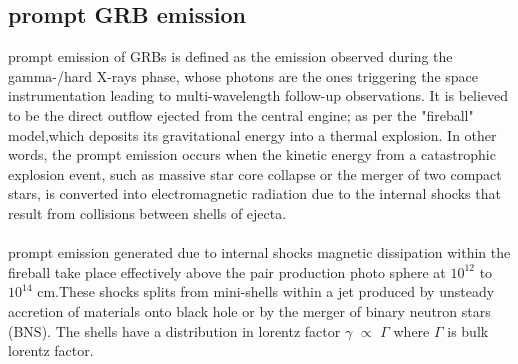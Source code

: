 \subsection{ prompt GRB emission}
 prompt emission of GRBs is defined as the emission observed during the gamma-/hard X-rays phase, whose photons are the ones triggering the space instrumentation leading to multi-wavelength follow-up observations.	It is believed to be the direct outflow ejected from the central engine; as per the "fireball" model,which deposits its gravitational energy into a thermal explosion. In other words, the prompt emission occurs when the kinetic energy from a catastrophic explosion event, such as massive star core collapse or the merger of two compact stars, is converted into electromagnetic radiation due to the internal shocks that result from collisions between shells of ejecta.\citep{23}\\\\
prompt emission generated due to internal shocks magnetic dissipation within the
fireball take place effectively above the pair production photo sphere at $ 10^{12} $ to  $ 10^{14} $ cm.These shocks splits from mini-shells within a jet produced by unsteady accretion of materials onto black hole or by the merger of binary neutron stars (BNS). The shells have a distribution in lorentz factor $ \gamma $ $ \propto $ $ \Gamma $ where $ \Gamma $ is bulk lorentz factor.\citep {22}\citep{23}\\\\
